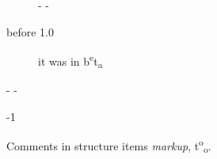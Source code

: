 \begin{description}\kern-\topsep
\makeatletter\advance\@topsepadd-\topsep\makeatother%
\item[before 1.0]{it was in b\textsuperscript{e}t\textsubscript{a}

}\end{description}%
\begin{description}\kern-\topsep
\makeatletter\advance\@topsepadd-\topsep\makeatother%
\item[version]{-1}\end{description}%
\label{container-page-test+u+package+++ml-module-Markup-val-foo}\begin{ocamlindent}Comments in structure items  \emph{markup}, t\textsuperscript{o}\textsubscript{o}.\end{ocamlindent}%
\medbreak


